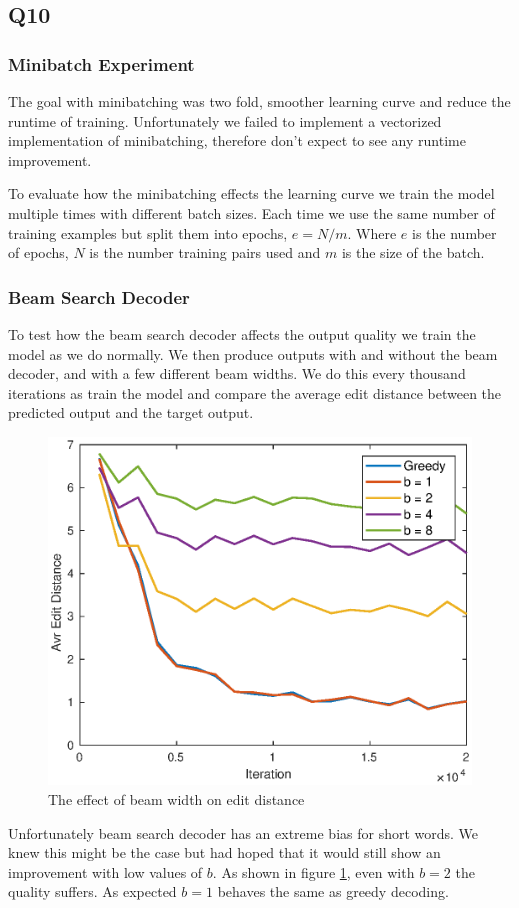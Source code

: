 \documentclass[12pt]{article}
\begin{document}
\subsection{Q10}

\subsubsection{Minibatch Experiment}

The goal with minibatching was two fold, smoother learning curve and reduce the runtime of training. Unfortunately we failed to implement a vectorized implementation of minibatching, therefore don't expect to see any runtime improvement.

To evaluate how the minibatching effects the learning curve we train the model multiple times with different batch sizes. Each time we use the same number of training examples but split them into epochs, $e = N/m$. Where $e$ is the number of epochs, $N$ is the number training pairs used and $m$ is the size of the batch. 

\subsubsection{Beam Search Decoder}

To test how the beam search decoder affects the output quality we train the model as we do normally. We then produce outputs with and without the beam decoder, and with a few different beam widths. We do this every thousand iterations as train the model and compare the average edit distance between the predicted output and the target output.

\begin{figure}[h]
    \centering
    \includegraphics[width=\linewidth]{img/beam_width3.eps}
    \caption{The effect of beam width on edit distance}
    \label{fig_beam_width}
\end{figure}

Unfortunately beam search decoder has an extreme bias for short words. We knew this might be the case but had hoped that it would still show an improvement with low values of $b$. As shown in figure \ref{fig_beam_width}, even with $b=2$ the quality suffers. As expected $b=1$ behaves the same as greedy decoding.
\end{document}
